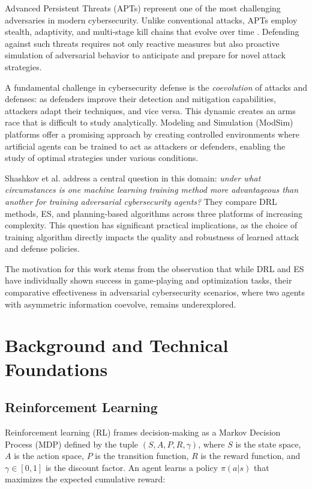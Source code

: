 \documentclass[conference, 10pt]{IEEEtran}
\begin{document}
Advanced Persistent Threats (APTs) represent one of the most challenging adversaries in modern cybersecurity. Unlike conventional attacks, APTs employ stealth, adaptivity, and multi-stage kill chains that evolve over time \cite{huang2020}. Defending against such threats requires not only reactive measures but also proactive simulation of adversarial behavior to anticipate and prepare for novel attack strategies.

A fundamental challenge in cybersecurity defense is the \textit{coevolution} of attacks and defenses: as defenders improve their detection and mitigation capabilities, attackers adapt their techniques, and vice versa. This dynamic creates an arms race that is difficult to study analytically. Modeling and Simulation (ModSim) platforms offer a promising approach by creating controlled environments where artificial agents can be trained to act as attackers or defenders, enabling the study of optimal strategies under various conditions.

Shashkov et al. \cite{shashkov2023} address a central question in this domain: \textit{under what circumstances is one machine learning training method more advantageous than another for training adversarial cybersecurity agents?} They compare DRL methods, ES, and planning-based algorithms across three platforms of increasing complexity. This question has significant practical implications, as the choice of training algorithm directly impacts the quality and robustness of learned attack and defense policies.

The motivation for this work stems from the observation that while DRL and ES have individually shown success in game-playing and optimization tasks, their comparative effectiveness in adversarial cybersecurity scenarios, where two agents with asymmetric information coevolve, remains underexplored.

\section{Background and Technical Foundations}

\subsection{Reinforcement Learning}

Reinforcement learning (RL) frames decision-making as a Markov Decision Process (MDP) defined by the tuple $(S, A, P, R, \gamma)$, where $S$ is the state space, $A$ is the action space, $P$ is the transition function, $R$ is the reward function, and $\gamma \in [0,1]$ is the discount factor. An agent learns a policy $\pi(a|s)$ that maximizes the expected cumulative reward:
\end{document}
